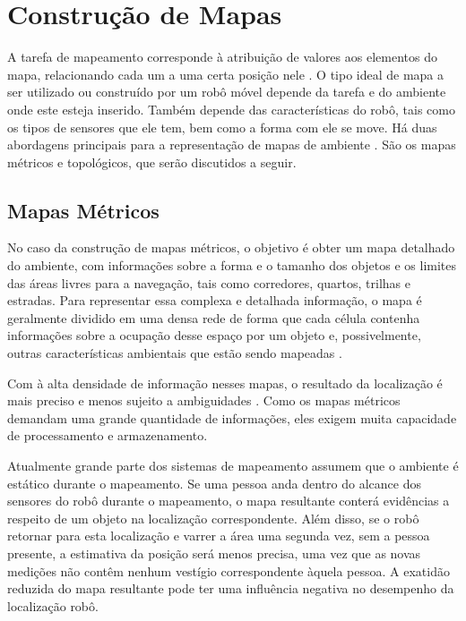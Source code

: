 

\section{Construção de Mapas}
A tarefa de mapeamento corresponde à atribuição de valores aos elementos do mapa, relacionando cada um a uma certa 
posição nele \cite{construcaoMapas2}. O tipo ideal de mapa
a ser utilizado ou construído por um robô móvel depende da tarefa e do ambiente onde
este esteja inserido. Também depende das características do robô, tais como os tipos
de sensores que ele tem, bem como a forma com ele se move\cite{construcaoMapas2}.  Há duas abordagens principais para a 
representação de mapas de ambiente \cite{construcaoMapas}.
São os mapas métricos e topológicos, que serão discutidos a seguir. 

\subsection{Mapas Métricos}
No caso da construção de mapas métricos, o objetivo é obter um mapa detalhado do ambiente, 
com informações sobre a forma e o tamanho dos objetos e os limites das
áreas livres para a navegação, tais como corredores, quartos, trilhas e estradas. Para
representar essa complexa e detalhada informação, o mapa é geralmente dividido em
uma densa rede de forma que cada célula contenha informações sobre a ocupação
desse espaço por um objeto e, possivelmente, outras características ambientais que
estão sendo mapeadas \cite{construcaoMapas2}. 

Com à alta densidade de informação nesses mapas, o resultado da localização é mais preciso e
menos sujeito a ambiguidades \cite{construcaoMapas2}. Como os mapas métricos 
demandam uma grande quantidade de informações, eles exigem muita capacidade de processamento e 
armazenamento.

Atualmente grande parte dos sistemas de mapeamento assumem que o ambiente é estático
durante o mapeamento. Se uma pessoa anda dentro do alcance dos sensores do robô durante o
mapeamento, o mapa resultante conterá evidências a respeito de um objeto na localização
correspondente. Além disso, se o robô retornar para esta localização e varrer a área uma
segunda vez, sem a pessoa presente, a estimativa da posição será menos precisa, uma vez que as novas medições não
contêm nenhum vestígio correspondente àquela pessoa. A exatidão reduzida do mapa
resultante pode ter uma influência negativa no desempenho da localização robô.

